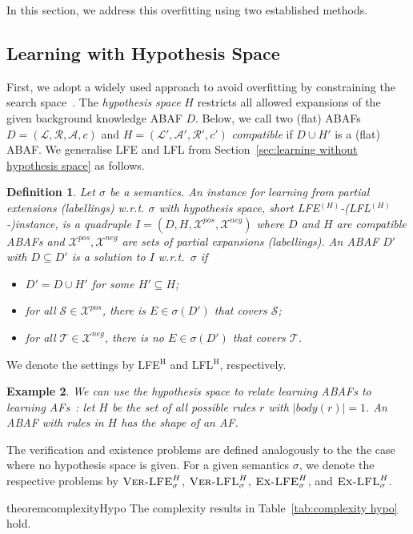 \documentclass[letterpaper]{article} %
\newcommand{\lit}{\ensuremath{\mathcal{L}}}
\newcommand{\rules}{\ensuremath{\mathcal{R}}}
\newcommand{\asm}{\ensuremath{\mathcal{A}}}
\newcommand{\atoms}{\mathcal{L}}
\newcommand{\ruleset}{\mathcal{R}}
\newcommand{\assumptions}{\mathcal{A}}
\newcommand{\contra}{c}
\newcommand{\contraryempty}{c}
\newcommand{\ABAdef}{D=(\atoms,\ruleset,\assumptions,\contra)}
\newcommand{\VerLFE}[2]{\textsc{Ver-LFE}_{#1}^{#2}}
\newcommand{\VerLFL}[2]{\textsc{Ver-LFL}_{#1}^{#2}}
\newcommand{\ExLFE}[2]{\textsc{Ex-LFE}_{#1}^{#2}}
\newcommand{\ExLFL}[2]{\textsc{Ex-LFL}_{#1}^{#2}}
\newcommand{\hypo}{H}
\newcommand{\Xpos}{\mathcal{X}^{pos}}
\newcommand{\Xneg}{\mathcal{X}^{neg}}
\newtheorem{example}{Example}[section]
\newtheorem{definition}[example]{Definition}
\begin{document}
In this section, we address this overfitting using two established methods. 

\subsection{Learning with Hypothesis Space}
\label{sec:learning with hypotheses}
\newcommand{\Hy}{$^\text{H}$\xspace}
First, we adopt a widely used approach to avoid overfitting by constraining the search space~\cite{MUGGLETON1994629}.
The \emph{hypothesis space} $\hypo$ restricts all allowed expansions of the given background knowledge ABAF $D$. 
Below, we call two (flat) ABAFs $\ABAdef$ and $H=(\lit',\asm',\rules',\contraryempty')$ \emph{compatible} if $D\cup H'$ is a (flat) ABAF.
We generalise LFE and LFL from Section~\ref{sec:learning without hypothesis space} as follows.
\begin{definition}\label{def:LFLH}
Let $\sigma$ be a semantics. An \emph{instance for learning from partial extensions (labellings) w.r.t. $\sigma$ with hypothesis space}, short \emph{LFE$^{(H)}$-(LFL$\!^{(H)}$-)instance}, is a quadruple $I=(D,\hypo,\Xpos,\Xneg)$ where $D$ and $H$ are compatible ABAFs and $\Xpos,\Xneg$ are sets of partial expansions (labellings).
An ABAF $D'$ with $D\subseteq D'$ is a \emph{solution} to $I$ w.r.t.\ $\sigma$ if
\begin{itemize}
\item $D'= D\cup \hypo'$ for some $\hypo'\subseteq \hypo$;  
\item for all $\mathcal S\in \Xpos$, there is $E\in \sigma(D')$ that covers $\mathcal S$;
\item 
for all $\mathcal T\in \Xneg$, there is no $E\in \sigma(D')$ that covers $\mathcal T$.
\end{itemize} 
\end{definition}
We denote the settings by LFE\Hy and LFL\!\Hy, respectively. 
\begin{example}
We can use the hypothesis space to relate learning ABAFs to learning AFs~\cite{BengelTR24,NiskanenWJ19}: let $\hypo$ be the set of all possible rules $r$  with $|body(r)|=1$. An ABAF with rules in $\hypo$ has the shape of an AF.
\end{example}
%
The verification and existence problems are defined analogously to the the case where no hypothesis space is given. For a given semantics $\sigma$, we denote the respective problems by $\VerLFE{\sigma}{H}$, $\VerLFL{\sigma}{H}$, $\ExLFE{\sigma}{H}$, and $\ExLFL{\sigma}{H}$. 
\begin{restatable}{theorem}{complexityHypo}
    The complexity results in Table~\ref{tab:complexity hypo} hold.
\end{restatable}
\end{document}

